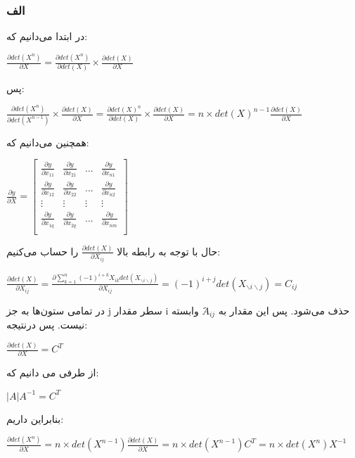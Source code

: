\subsubsection*{الف}

در ابتدا می‌دانیم که:

\setLTR
$
\frac{\partial det(X^n)}{\partial X} = \frac{\partial det(X^n)}{\partial det(X)} \times \frac{\partial det(X)}{\partial X}
$
\setRTL

پس:

\setLTR
$
\frac{\partial det(X^n)}{\partial det(X^{n-1})} \times \frac{\partial det(X)}{\partial X} =  \frac{\partial det(X)^n}{\partial det(X)} \times  \frac{\partial det(X)}{\partial X} = n\times det(X)^{n-1} \frac{\partial det(X)}{\partial X} 
$
\setRTL

همچنین می‌دانیم که:

\setLTR
$
\frac{\partial y}{\partial X} = \begin{bmatrix}
	\frac{\partial y}{\partial x_{11}} & \frac{\partial y}{\partial x_{21}} & \dots & \frac{\partial y}{\partial x_{n1}} \\
	\frac{\partial y}{\partial x_{12}} & \frac{\partial y}{\partial x_{22}} & \dots & \frac{\partial y}{\partial x_{n2}} \\
	\vdots &\vdots &\vdots &\vdots \\
	\frac{\partial y}{\partial x_{1q}} & \frac{\partial y}{\partial x_{2q}} & \dots & \frac{\partial y}{\partial x_{nm}} \\
	
	
\end{bmatrix}
$
\setRTL


حال با توجه به رابطه بالا 
$\frac{\partial det(X)}{\partial X_{ij}}$
را حساب می‌کنیم:

\setLTR
$
\frac{\partial det(X)}{\partial X_{ij}} = \frac{\partial \sum_{k=1}^{n}(-1)^{i+k}X_{ik}det(X_{\backslash i \backslash j})}{\partial X_{ij}} = (-1)^{i+j} det(X_{\backslash i \backslash j}) = C_{ij}
 $
\setRTL

در تمامی ستون‌ها به جز j سطر مقدار i حذف می‌شود. پس این مقدار به 
$َA_{ij}$
وابسته نیست. پس درنتیجه:

\setLTR
$
\frac{\partial det(X)}{\partial X} = C^T
$
\setRTL

از طرفی می دانیم که:

\setLTR
$
|A|A^{-1} = C^T
$
\setRTL

بنابراین داریم:

\setLTR
$
\frac{\partial det(X^n)}{\partial X} = n \times det(X^{n-1})\frac{\partial det(X)}{\partial X} = n \times det(X^{n-1})C^T = n \times det(X^n)X^{-1}
$
\setRTL


